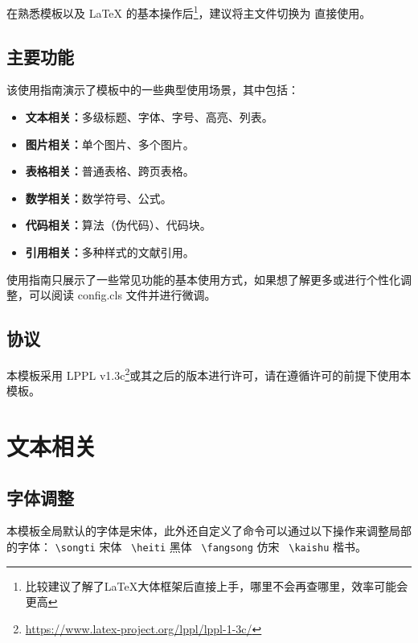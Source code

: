 \documentclass[
    report,     %
    oneside,    %
    UTF8,       %
    zihao=-4    %
]{config} %
\begin{document}
在熟悉模板以及 \LaTeX{} 的基本操作后\footnote{比较建议了解了\LaTeX{}大体框架后直接上手，哪里不会再查哪里，效率可能会更高}，建议将主文件切换为  直接使用。


\section{主要功能}

该使用指南演示了模板中的一些典型使用场景，其中包括：

\begin{itemize}[itemsep=2pt,topsep=0.6pt,parsep=0.6pt] %
    \item \textbf{文本相关：}多级标题、字体、字号、高亮、列表。
    \item \textbf{图片相关：}单个图片、多个图片。
    \item \textbf{表格相关：}普通表格、跨页表格。
    \item \textbf{数学相关：}数学符号、公式。
    \item \textbf{代码相关：}算法（伪代码）、代码块。
    \item \textbf{引用相关：}多种样式的文献引用。    
\end{itemize}

使用指南只展示了一些常见功能的基本使用方式，如果想了解更多或进行个性化调整，可以阅读 config.cls 文件并进行微调。

\section{协议}
本模板采用 LPPL v1.3c\footnote{\url{https://www.latex-project.org/lppl/lppl-1-3c/}}或其之后的版本进行许可，请在遵循许可的前提下使用本模板。



\chapter{文本相关}

\section{字体调整}

本模板全局默认的字体是宋体，此外还自定义了命令可以通过以下操作来调整局部的字体：
\verb|\songti|  {\songti 宋体} \ 
\verb|\heiti|  {\heiti 黑体} \ 
\verb|\fangsong|  {\fangsong 仿宋} \ 
\verb|\kaishu|  {\kaishu 楷书}。
\end{document}
